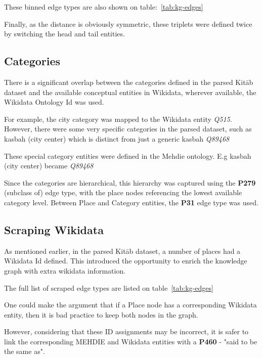 These binned edge types are also shown on table:~\ref{tab:kg-edges}

Finally, as the distance is obviously symmetric, these triplets were defined twice by switching the head and tail
entities.

\subsection{Categories}
There is a significant overlap between the categories defined in the parsed Kitāb dataset and the available
conceptual entities in Wikidata, wherever available, the Wikidata Ontology Id was used.

For example, the city category was mapped to the Wikidata entity \textit{Q515}.
However, there were some very specific categories in the parsed dataset, such
as kasbah (city center) which is distinct from just a generic kasbah \textit{Q89468}

These special category entities were defined in the Mehdie ontology.
E.g kasbah (city center) became \textit{Q89468}

Since the categories are hierarchical, this hierarchy was captured using the \textbf{P279}
(subclass of) edge type, with the place nodes referencing the lowest available category level.
Between Place and Category entities, the \textbf{P31} edge type was used.

\subsection{Scraping Wikidata}
As mentioned earlier, in the parsed Kitāb dataset, a number of places had a Wikidata Id defined.
This introduced the opportunity to enrich the knowledge graph with extra wikidata information.

The full list of scraped edge types are listed on table~\ref{tab:kg-edges}

One could make the argument that if a Place node has a corresponding Wikidata entity,
then it is bad practice to keep both nodes in the graph.

However, considering that these ID assignments may be incorrect, it is safer to link the corresponding
MEHDIE and Wikidata entities with a \textbf{P460} - "said to be the same as".

